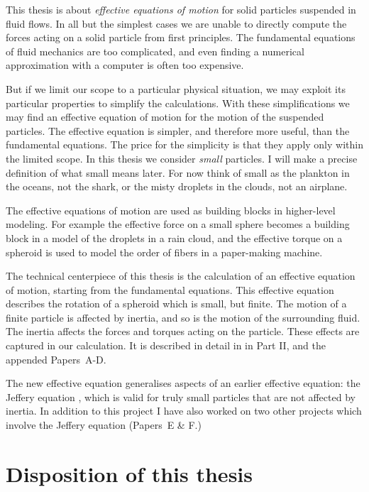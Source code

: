 \documentclass[thesis.tex]{subfiles}
\begin{document}
This thesis is about \emph{effective equations of motion} for solid particles suspended in fluid flows. In all but the simplest cases we are unable to directly compute the forces acting on a solid particle from first principles. The fundamental equations of fluid mechanics are too complicated, and even finding a numerical approximation with a computer is often too expensive.

But if we limit our scope to a particular physical situation, we may exploit its particular properties to simplify the calculations. With these simplifications we may find an effective equation of motion for the motion of the suspended particles. The effective equation is simpler, and therefore more useful, than the fundamental equations. The price for the simplicity is that they apply only within the limited scope. In this thesis we consider \emph{small} particles. I will make a precise definition of what small means later. For now think of small as the plankton in the oceans, not the shark, or the misty droplets in the clouds, not an airplane.

The effective equations of motion are used as building blocks in higher-level modeling. For example the effective force on a small sphere becomes a building block in a model of the droplets in a rain cloud, and the effective torque on a spheroid is used to model the order of fibers in a paper-making machine.

The technical centerpiece of this thesis is the calculation of an effective equation of motion, starting from the fundamental equations. This effective equation describes the rotation of a spheroid which is small, but finite. The motion of a finite particle is affected by inertia, and so is the motion of the surrounding fluid. The inertia affects the forces and torques acting on the particle. These effects are captured in our calculation. It is described in detail in  in Part II, and the appended Papers~A-D.

The new effective equation generalises aspects of an earlier effective equation: the Jeffery equation \cite{jeffery1922}, which is valid for truly small particles that are not affected by inertia. In addition to this project I have also worked on two other projects which involve the Jeffery equation (Papers~E \& F.)

\section*{Disposition of this thesis}
\end{document}
